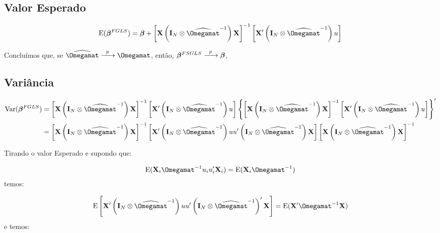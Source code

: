 \documentclass[11pt, oneside, a4paper, article]{article}
\numberwithin{equation}{section}
\begin{document}
\begin{description}
\subsection{Valor Esperado}

\vspace{-1 em}
\begin{align*}
\E(\betavec^{FGLS})
= 
\betavec +
\left[ \Xmat \left( \Imat_{N} \otimes \widehat{\Omegamat}^{-1} \right) \Xmat \right]^{-1}
\left[ \Xmat' \left( \Imat_{N} \otimes \widehat{\Omegamat}^{-1} \right) u \right]
\end{align*}

Concluímos que, se 
$\widehat{\Omegamat} \xrightarrow{\enskip p \enskip} \Omegamat$,
então,
$\boldsymbol{\beta}^{FSGLS} \xrightarrow{\enskip p \enskip} \boldsymbol{\beta}$,

\subsection{Variância}

\vspace{-1 em}
\begin{align*}
\Var(\betavec^{FGLS})
&= 
\left[ \Xmat \left( \Imat_{N} \otimes \widehat{\Omegamat}^{-1} \right) \Xmat \right]^{-1}
\left[ \Xmat' \left( \Imat_{N} \otimes \widehat{\Omegamat}^{-1} \right) u \right]
\left\{ 
\left[ \Xmat \left( \Imat_{N} \otimes \widehat{\Omegamat}^{-1} \right) \Xmat \right]^{-1}
\left[ \Xmat' \left( \Imat_{N} \otimes \widehat{\Omegamat}^{-1} \right) u \right]
\right\}^{\prime}
\\
&=
\left[ \Xmat \left( \Imat_{N} \otimes \widehat{\Omegamat}^{-1} \right) \Xmat \right]^{-1}
\left[
\Xmat' \left( \Imat_{N} \otimes \widehat{\Omegamat}^{-1} \right) 
u u'
\left( \Imat_{N} \otimes \widehat{\Omegamat}^{-1} \right) \Xmat
\right]
\left[ \Xmat \left( \Imat_{N} \otimes \widehat{\Omegamat}^{-1} \right) \Xmat \right]^{-1}
\end{align*}

Tirando o valor Esperado e supondo que:

\vspace{-1.5 em}
\begin{align*}
\E(\Xmat_{i} \Omegamat^{-1} u_{i} u_{i}' \Xmat_{i}) = \E(\Xmat_{i} \Omegamat^{-1})
\end{align*}
temos:

\vspace{-1.5 em}
\begin{align*}
\E\left[ \Xmat' \left( \Imat_{N} \otimes \widehat{\Omegamat}^{-1} \right)
u u'
\left( \Imat_{N} \otimes \widehat{\Omegamat}^{-1} \right)' \Xmat \right]
=
\E(\Xmat' \Omegamat^{-1} \Xmat)
\end{align*}
e temos:


\end{description}
\end{document}
